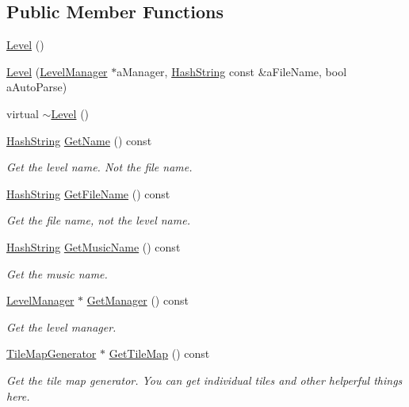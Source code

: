 \subsection*{Public Member Functions}
\begin{DoxyCompactItemize}
\item 
\hyperlink{classLevel_a7a696c928ca5d5354db6e50e46d0f67d}{Level} ()
\item 
\hyperlink{classLevel_a737831b7717488b3155c177960d66ff7}{Level} (\hyperlink{classLevelManager}{Level\+Manager} $\ast$a\+Manager, \hyperlink{classHashString}{Hash\+String} const \&a\+File\+Name, bool a\+Auto\+Parse)
\item 
virtual \hyperlink{classLevel_a249eac1e8f19ff44134efa5e986feaca}{$\sim$\+Level} ()
\item 
\hyperlink{classHashString}{Hash\+String} \hyperlink{classLevel_a8ab40ea8bcff19d951aa28d67150f539}{Get\+Name} () const 
\begin{DoxyCompactList}\small\item\em Get the level name. Not the file name. \end{DoxyCompactList}\item 
\hyperlink{classHashString}{Hash\+String} \hyperlink{classLevel_ac344c48b047885b7f24e79332e0dfeab}{Get\+File\+Name} () const 
\begin{DoxyCompactList}\small\item\em Get the file name, not the level name. \end{DoxyCompactList}\item 
\hyperlink{classHashString}{Hash\+String} \hyperlink{classLevel_adba67967a31ee5fc6d0885e2547424d0}{Get\+Music\+Name} () const 
\begin{DoxyCompactList}\small\item\em Get the music name. \end{DoxyCompactList}\item 
\hyperlink{classLevelManager}{Level\+Manager} $\ast$ \hyperlink{classLevel_a2353095571549c1b11dae5d9b8c29d11}{Get\+Manager} () const 
\begin{DoxyCompactList}\small\item\em Get the level manager. \end{DoxyCompactList}\item 
\hyperlink{classTileMapGenerator}{Tile\+Map\+Generator} $\ast$ \hyperlink{classLevel_a05fd91502d2caefafe3d8be814773484}{Get\+Tile\+Map} () const 
\begin{DoxyCompactList}\small\item\em Get the tile map generator. You can get individual tiles and other helperful things here. \end{DoxyCompactList}\item 

\end{DoxyCompactItemize}
